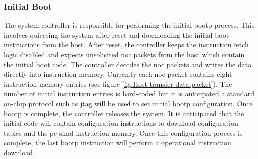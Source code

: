 \subsubsection{Initial Boot}
\label{sec:Initial Boot}

The system controller is responsible for performing the initial \ac{bootp} process.
This involves quiecsing the system after reset and downloading the initial boot instructions from the host.
After reset, the controller keeps the instruction fetch logic disabled and expects unsolicited \ac{noc} packets from the host which contain the initial boot code.
The controller decodes the \ac{noc} packets and writes the data directly into instruction memory.
Currently each \ac{noc} packet contains eight instruction memory entries (see figure \ref{fig:Host transfer data packet}).
The number of initial instruction entries is hard-coded but it is anticipated a standard on-chip protocol such as \ac{jtag} will be used to set initial \ac{bootp} configuration.
Once \ac{bootp} is complete, the controller releases the system.
It is anticipated that the initial code will contain configuration instructions to download configuration tables and the \ac{pe} \ac{simd} instruction memory.
Once this configuration process is complete, the last \ac{bootp} instruction will perform a operational instruction download.

